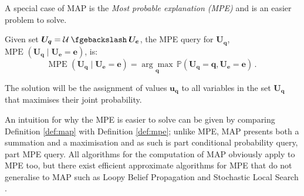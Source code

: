 A special case of MAP is the \textit{Most probable explanation (MPE)} and is an easier problem to solve.
\begin{definition}  \label{def:mpe}
 Given set $ \boldsymbol{U_q}= \mathcal{U} \mysetminus \boldsymbol{U_e}$, the MPE query for $\boldsymbol{U_q}$, $\text{MPE }( \boldsymbol{U_q}\mid \boldsymbol{U_e}=\boldsymbol{e} )$, is:
	\begin{equation*} 
		\text{MPE }( \boldsymbol{U_q} \mid \boldsymbol{U_e}=\boldsymbol{e} ) = \underset{\boldsymbol{q}}{\arg\max}\, \mathbb{P}(\boldsymbol{U_q}=\boldsymbol{q} , \boldsymbol{U_e}=\boldsymbol{e}) \,.
	\end{equation*}
\end{definition}
The solution will be the assignment of values $\boldsymbol{u_q}$ to all variables in the set $\boldsymbol{U_q}$ that maximises their joint probability.

An intuition for why the MPE is easier to solve can be given by comparing Definition \ref{def:map} with Definition \ref{def:mpe}; unlike MPE, MAP presents both a summation and a maximisation and as such is part conditional probability query, part MPE query.
All algorithms for the computation of MAP obviously apply to MPE too, but there exist efficient approximate algorithms for MPE that do not generalise to MAP such as Loopy Belief Propagation \citep{Pearl1988} and Stochastic Local Search \citep{Kask1999}.